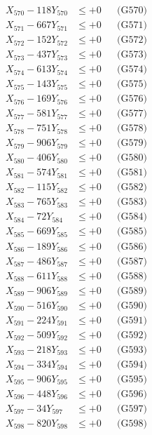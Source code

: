 \documentclass[a4paper,10pt]{article}
\begin{document}
{\begin{align}
X_{570} - 118Y_{570} &\leq +0 && \text{(G570)} \\
\allowbreak
X_{571} - 667Y_{571} &\leq +0 && \text{(G571)} \\
X_{572} - 152Y_{572} &\leq +0 && \text{(G572)} \\
X_{573} - 437Y_{573} &\leq +0 && \text{(G573)} \\
X_{574} - 613Y_{574} &\leq +0 && \text{(G574)} \\
X_{575} - 143Y_{575} &\leq +0 && \text{(G575)} \\
X_{576} - 169Y_{576} &\leq +0 && \text{(G576)} \\
X_{577} - 581Y_{577} &\leq +0 && \text{(G577)} \\
X_{578} - 751Y_{578} &\leq +0 && \text{(G578)} \\
X_{579} - 906Y_{579} &\leq +0 && \text{(G579)} \\
X_{580} - 406Y_{580} &\leq +0 && \text{(G580)} \\
\allowbreak
X_{581} - 574Y_{581} &\leq +0 && \text{(G581)} \\
X_{582} - 115Y_{582} &\leq +0 && \text{(G582)} \\
X_{583} - 765Y_{583} &\leq +0 && \text{(G583)} \\
X_{584} - 72Y_{584} &\leq +0 && \text{(G584)} \\
X_{585} - 669Y_{585} &\leq +0 && \text{(G585)} \\
X_{586} - 189Y_{586} &\leq +0 && \text{(G586)} \\
X_{587} - 486Y_{587} &\leq +0 && \text{(G587)} \\
X_{588} - 611Y_{588} &\leq +0 && \text{(G588)} \\
X_{589} - 906Y_{589} &\leq +0 && \text{(G589)} \\
X_{590} - 516Y_{590} &\leq +0 && \text{(G590)} \\
\allowbreak
X_{591} - 224Y_{591} &\leq +0 && \text{(G591)} \\
X_{592} - 509Y_{592} &\leq +0 && \text{(G592)} \\
X_{593} - 218Y_{593} &\leq +0 && \text{(G593)} \\
X_{594} - 334Y_{594} &\leq +0 && \text{(G594)} \\
X_{595} - 906Y_{595} &\leq +0 && \text{(G595)} \\
X_{596} - 448Y_{596} &\leq +0 && \text{(G596)} \\
X_{597} - 34Y_{597} &\leq +0 && \text{(G597)} \\
X_{598} - 820Y_{598} &\leq +0 && \text{(G598)} \\

\end{align}}
\end{document}
